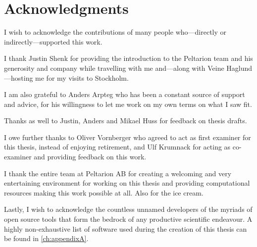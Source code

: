 \chapter*{Acknowledgments}

I wish to acknowledge the contributions of many people who---directly or
indirectly---supported this work.

I thank Justin Shenk for providing the introduction to the Peltarion team and
his generosity and company while travelling with me and---along with
Veine Haglund---hosting me for my visits to Stockholm.

I am also grateful to Anders Arpteg who has been a constant source of support
and advice, for his willingness to let me work on my own terms on what I saw fit.

Thanks as well to Justin, Anders and Mikael Huss for feedback on thesis drafts.

I owe further thanks to Oliver Vornberger who agreed to act as first
examiner for this thesis, instead of enjoying retirement, and Ulf Krumnack
for acting as co-examiner and providing feedback on this work.

I thank the entire team at Peltarion AB for creating a welcoming and very
entertaining environment for working on this thesis and providing computational
resources making this work possible at all.  Also for the ice cream.

Lastly, I wish to acknowledge the countless unnamed developers of the myriads of
open source tools that form the bedrock of any productive scientific endeavour.
A highly non-exhaustive list of software used during the creation of this thesis can be found in
\cref{ch:appendixA}.
